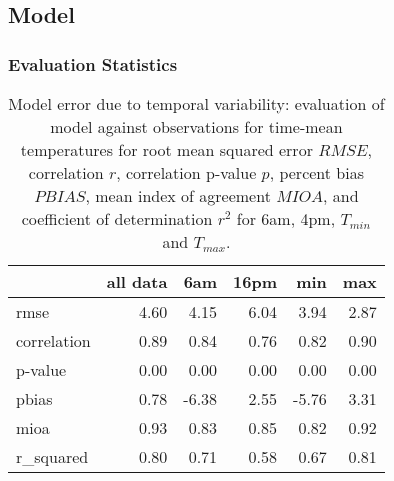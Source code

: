 \subsection{Model}
\label{sec:results_model}

\subsubsection{Evaluation Statistics}

\begin{table}
\centering
\begin{tabular}{lrrrrr}
\toprule
{} &  all data &     6am &   16pm &   min &  max \\
\midrule
rmse        &      4.60 &  4.15 & 6.04 &  3.94 & 2.87 \\
correlation &      0.89 &  0.84 & 0.76 &  0.82 & 0.90 \\
p-value     &      0.00 &  0.00 & 0.00 &  0.00 & 0.00 \\
pbias       &      0.78 & -6.38 & 2.55 & -5.76 & 3.31 \\
mioa        &      0.93 &  0.83 & 0.85 &  0.82 & 0.92 \\
r\_squared   &      0.80 &  0.71 & 0.58 &  0.67 & 0.81 \\
\bottomrule
\end{tabular}
\caption{Model error due to temporal variability: evaluation of model against observations for time-mean temperatures for root mean squared error $RMSE$, correlation  $r$, correlation p-value $p$, percent bias $PBIAS$, mean index of agreement $MIOA$, and coefficient of determination $r^2$ for 6am, 4pm, $T_{min}$ and $T_{max}$.  }
\label{tab:time_error}
\end{table}

